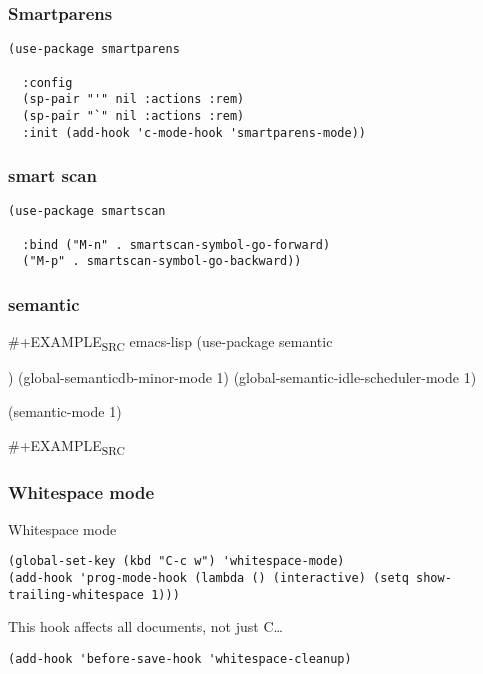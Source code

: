 \documentclass[12pt]{article}
\begin{document}
\subsubsection{Smartparens}
\label{sec:org38f6672}

\begin{verbatim}
(use-package smartparens

  :config
  (sp-pair "'" nil :actions :rem)
  (sp-pair "`" nil :actions :rem)
  :init (add-hook 'c-mode-hook 'smartparens-mode))
\end{verbatim}

\subsubsection{smart scan}
\label{sec:orgd678473}

\begin{verbatim}
(use-package smartscan

  :bind ("M-n" . smartscan-symbol-go-forward)
  ("M-p" . smartscan-symbol-go-backward))

\end{verbatim}

\subsubsection{semantic}
\label{sec:org2bbb77e}


\#+EXAMPLE\textsubscript{SRC} emacs-lisp
(use-package semantic

)
(global-semanticdb-minor-mode 1)
(global-semantic-idle-scheduler-mode 1)

(semantic-mode 1)

\#+EXAMPLE\textsubscript{SRC}
\subsubsection{Whitespace mode}
\label{sec:orgebd3c91}

Whitespace mode

\begin{verbatim}
(global-set-key (kbd "C-c w") 'whitespace-mode)
(add-hook 'prog-mode-hook (lambda () (interactive) (setq show-trailing-whitespace 1)))
\end{verbatim}

This hook affects all documents, not just C\ldots{}
\begin{verbatim}
(add-hook 'before-save-hook 'whitespace-cleanup)
\end{verbatim}
\end{document}
